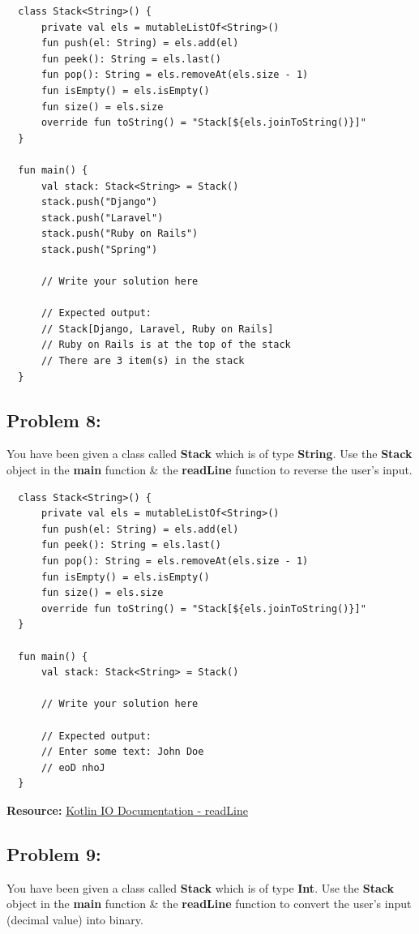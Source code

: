 \documentclass{article}
\begin{document}
\begin{verbatim}
  class Stack<String>() {
      private val els = mutableListOf<String>()
      fun push(el: String) = els.add(el)
      fun peek(): String = els.last()
      fun pop(): String = els.removeAt(els.size - 1)
      fun isEmpty() = els.isEmpty()
      fun size() = els.size
      override fun toString() = "Stack[${els.joinToString()}]"
  }

  fun main() {
      val stack: Stack<String> = Stack()
      stack.push("Django")
      stack.push("Laravel")
      stack.push("Ruby on Rails")
      stack.push("Spring")

      // Write your solution here

      // Expected output:
      // Stack[Django, Laravel, Ruby on Rails]
      // Ruby on Rails is at the top of the stack
      // There are 3 item(s) in the stack
  }
\end{verbatim}

\subsection*{Problem 8:}
You have been given a class called \textbf{Stack} which is of type \textbf{String}. Use the \textbf{Stack} object in the \textbf{main} function \& the \textbf{readLine} function to reverse the user's input.

\begin{verbatim}
  class Stack<String>() {
      private val els = mutableListOf<String>()
      fun push(el: String) = els.add(el)
      fun peek(): String = els.last()
      fun pop(): String = els.removeAt(els.size - 1)
      fun isEmpty() = els.isEmpty()
      fun size() = els.size
      override fun toString() = "Stack[${els.joinToString()}]"
  }

  fun main() {
      val stack: Stack<String> = Stack()

      // Write your solution here

      // Expected output:
      // Enter some text: John Doe
      // eoD nhoJ
  }
\end{verbatim}

\textbf{Resource:} \href{https://kotlinlang.org/api/latest/jvm/stdlib/kotlin.io/read-line.html}{Kotlin IO Documentation - readLine}

\subsection*{Problem 9:}
You have been given a class called \textbf{Stack} which is of type \textbf{Int}. Use the \textbf{Stack} object in the \textbf{main} function \& the \textbf{readLine} function to convert the user's input (decimal value) into binary.
\end{document}
